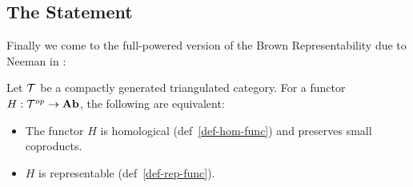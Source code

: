 \documentclass[12pt]{article}
\begin{document}
\subsection{The Statement}
Finally we come to the full-powered version of the Brown Representability due to Neeman in \cite{neeman-article}:
\begin{thm}
	Let $\mathcal{T}$ be a compactly generated triangulated category. For a functor $H:\mathcal{T}^{op}\to\mathbf{Ab}$, the following 
	are equivalent:
	\begin{itemize}
		\item The functor $H$ is homological (def~\ref{def-hom-func}) and preserves small coproducts.
		\item $H$ is representable (def~\ref{def-rep-func}).
	\end{itemize}
\end{thm}
\end{document}
